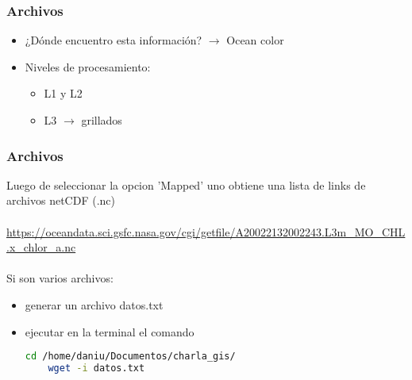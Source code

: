 \documentclass{beamer}
\begin{document}
\begin{frame}[t]
\frametitle{Archivos}

\begin{itemize}
	\item<1->[] ¿Dónde encuentro esta información? $\rightarrow$ Ocean color \href{https://oceancolor.gsfc.nasa.gov/}{}

	\item<2->[] Niveles de procesamiento:
\begin{itemize}
	\item L1 y L2
	\item L3 $\rightarrow$ grillados 
\end{itemize}

   \begin{figure}
	
	
   \end{figure}

\end{itemize}
\end{frame}


\begin{frame}[fragile]
\frametitle{Archivos}

Luego de seleccionar la opcion 'Mapped' uno obtiene una lista de links de archivos netCDF (.nc)
\\~\\
\url{https://oceandata.sci.gsfc.nasa.gov/cgi/getfile/A20022132002243.L3m_MO_CHL.x_chlor_a.nc} \href{https://oceandata.sci.gsfc.nasa.gov/cgi/getfile/A20022132002243.L3m_MO_CHL.x_chlor_a.nc}{}
\\~\\

\pause
Si son varios archivos:
\begin{itemize}
	\item generar un archivo datos.txt 
	\item ejecutar en la terminal el comando 
	
	\begin{lstlisting}[language=bash, basicstyle=\scriptsize]
	cd /home/daniu/Documentos/charla_gis/
	wget -i datos.txt  
	\end{lstlisting}
\end{itemize}

\end{frame}
\end{document}
